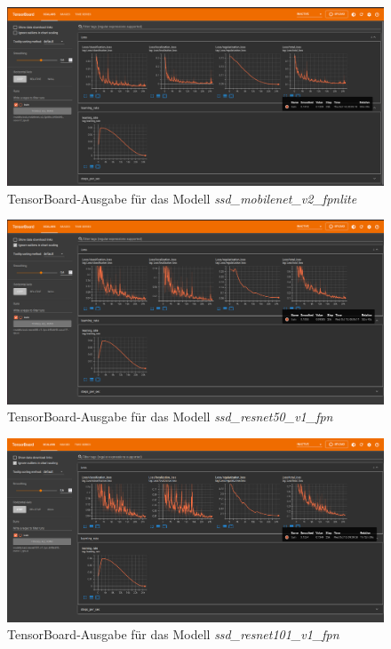     \begin{figure}[H]
        \centering
        \includegraphics[angle = 90, height = 0.92\textheight]{Bilder/models/model_comparison/tensorboards/ssd_mobilenet_v2_fpnlite_640x640_coco17_tpu-8.png}
        \caption{TensorBoard-Ausgabe für das Modell \textit{ssd\_mobilenet\_v2\_fpnlite}}
        \label{fig:TensorBoard-6}
    \end{figure}
    
    \begin{figure}[H]
        \centering
        \includegraphics[angle = 90, height = 0.92\textheight]{Bilder/models/model_comparison/tensorboards/ssd_resnet50_v1_fpn_640x640_coco17_tpu-8.png}
        \caption{TensorBoard-Ausgabe für das Modell \textit{ssd\_resnet50\_v1\_fpn}}
        \label{fig:TensorBoard-7}
    \end{figure}
    
    \begin{figure}[H]
        \centering
        \includegraphics[angle = 90, height = 0.92\textheight]{Bilder/models/model_comparison/tensorboards/ssd_resnet101_v1_fpn_640x640_coco17_tpu-8.png}
        \caption{TensorBoard-Ausgabe für das Modell \textit{ssd\_resnet101\_v1\_fpn}}
        \label{fig:TensorBoard-8}
    \end{figure}
    
